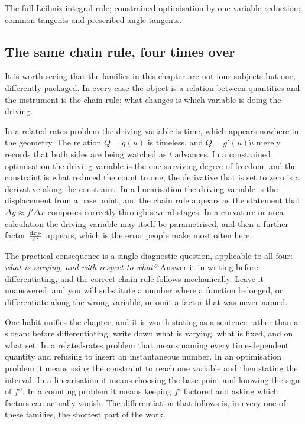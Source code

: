 \begin{seealsob}The full Leibniz integral rule; constrained optimisation by one-variable reduction; common tangents and prescribed-angle tangents.\end{seealsob}

\subsection{The same chain rule, four times over}

It is worth seeing that the families in this chapter are not four subjects but one, differently packaged. In every case the object is a relation between quantities and the instrument is the chain rule; what changes is which variable is doing the driving.

In a related-rates problem the driving variable is time, which appears nowhere in the geometry. The relation $Q=g(u)$ is timeless, and $\dot Q=g'(u)\dot u$ merely records that both sides are being watched as $t$ advances. In a constrained optimisation the driving variable is the one surviving degree of freedom, and the constraint is what reduced the count to one; the derivative that is set to zero is a derivative along the constraint. In a linearisation the driving variable is the displacement from a base point, and the chain rule appears as the statement that $\Delta y\approx f'\Delta x$ composes correctly through several stages. In a curvature or area calculation the driving variable may itself be parametrised, and then a further factor $\frac{\mathrm{d}x_{P}}{\mathrm{d}t}$ appears, which is the error people make most often here.

The practical consequence is a single diagnostic question, applicable to all four: \emph{what is varying, and with respect to what?} Answer it in writing before differentiating, and the correct chain rule follows mechanically. Leave it unanswered, and you will substitute a number where a function belonged, or differentiate along the wrong variable, or omit a factor that was never named.

One habit unifies the chapter, and it is worth stating as a sentence rather than a slogan: before differentiating, write down what is varying, what is fixed, and on what set. In a related-rates problem that means naming every time-dependent quantity and refusing to insert an instantaneous number. In an optimisation problem it means using the constraint to reach one variable and then stating the interval. In a linearisation it means choosing the base point and knowing the sign of $f''$. In a counting problem it means keeping $f'$ factored and asking which factors can actually vanish. The differentiation that follows is, in every one of these families, the shortest part of the work.

